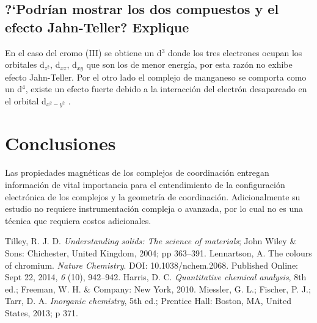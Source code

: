 \documentclass[fleqn,10pt]{SelfArx} %
\begin{document}
	\subsection{?`Podr\'ian mostrar los dos compuestos  y  el efecto Jahn-Teller? Explique}
	En el caso del cromo (III) se obtiene un d$^3$ donde los tres electrones ocupan los orbitales d$_{z^2}$, d$_{xz}$, d$_{xy}$ que son los de menor energ\'ia, por esta raz\'on no exhibe efecto Jahn-Teller. Por el otro lado el complejo de manganeso se comporta como un d$^4$, existe un efecto fuerte debido a la interacci\'on del electr\'on desapareado en el orbital d$_{x^2-y^2}$ \cite{Jahn-Teller}.
	
	\section{Conclusiones}
	Las propiedades magn\'eticas de los complejos de coordinaci\'on entregan informaci\'on de vital importancia para el entendimiento de la configuraci\'on electr\'onica de los complejos y la geometr\'ia de coordinaci\'on. Adicionalmente su estudio no requiere instrumentaci\'on compleja o avanzada, por lo cual no es una t\'ecnica que requiera costos adicionales.

	
	\begin{thebibliography}{9}
	    Tilley, R. J. D. \textit{Understanding solids: The science of materials}; John Wiley & Sons: Chichester, United Kingdom, 2004; pp 363–391.
	    Lennartson, A. The colours of chromium. \textit{Nature Chemistry}. DOI: 10.1038/nchem.2068. Published Online: Sept 22, 2014, \textit{6} (10), 942–942.
	    Harris, D. C. \textit{Quantitative chemical analysis}, 8th ed.; Freeman, W. H. & Company: New York, 2010.
	    Miessler, G. L.; Fischer, P. J.; Tarr, D. A. \textit{Inorganic chemistry}, 5th ed.; Prentice Hall: Boston, MA, United States, 2013; p 371.
	\end{thebibliography}
\end{document}
